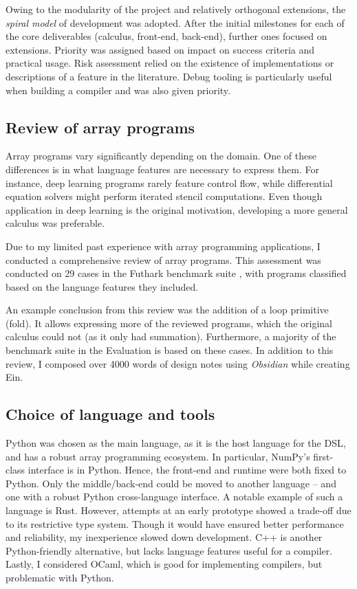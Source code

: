 Owing to the modularity of the project and relatively orthogonal extensions, the \textit{spiral model} of development was adopted. After the initial milestones for each of the core deliverables (calculus, front-end, back-end), further ones focused on extensions. Priority was assigned based on impact on success criteria and practical usage. Risk assessment relied on the existence of implementations or descriptions of a feature in the literature. Debug tooling is particularly useful when building a compiler and was also given priority.

\subsection{Review of array programs}
\label{suite-review}

Array programs vary significantly depending on the domain. One of these differences is in what language features are necessary to express them. For instance, deep learning programs rarely feature control flow, while differential equation solvers might perform iterated stencil computations. Even though application in deep learning is the original motivation, developing a more general calculus was preferable.

Due to my limited past experience with array programming applications, I conducted a comprehensive review of array programs. This assessment was conducted on 29 cases in the Futhark benchmark suite \cite{The_Futhark_Hackers_futhark-benchmarks}, with programs classified based on the language features they included.

An example conclusion from this review was the addition of a loop primitive (fold). It allows expressing more of the reviewed programs, which the original calculus could not (as it only had summation). 
Furthermore, a majority of the benchmark suite in the Evaluation is based on these cases. 
In addition to this review, I composed over 4000 words of design notes using \textit{Obsidian} while creating Ein.

\subsection{Choice of language and tools}

Python was chosen as the main language, as it is the host language for the DSL, and has a robust array programming ecosystem. 
In particular, NumPy's first-class interface is in Python. 
Hence, the front-end and runtime were both fixed to Python. 
Only the middle/back-end could be moved to another language -- and one with a robust Python cross-language interface. A notable example of such a language is Rust. However, attempts at an early prototype showed a trade-off due to its restrictive type system. Though it would have ensured better performance and reliability, my inexperience slowed down development. C++ is another Python-friendly alternative, but lacks language features useful for a compiler. Lastly, I considered OCaml, which is good for implementing compilers, but problematic with Python. 

